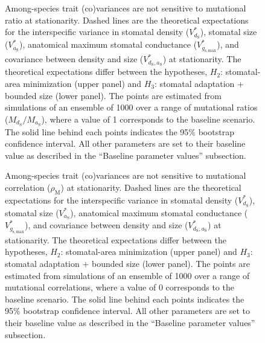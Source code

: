 \documentclass[
  letterpaper,
  DIV=11,
  numbers=noendperiod]{scrartcl}
\begin{document}
\newpage

\begin{figure}
\caption{Among-species trait (co)variances are not sensitive to mutational ratio at stationarity. Dashed lines are the theoretical expectations for the interspecific variance in stomatal density ($V_{d_\mathrm{S}}^*$), stomatal size ($V_{a_\mathrm{S}}^*$), anatomical maximum stomatal conductance ($V_{g_\mathrm{s,max}}^*$), and covariance between density and size ($V_{d_\mathrm{S},a_\mathrm{S}}^*$) at stationarity. The theoretical expectations differ between the hypotheses, $H_2$: stomatal-area minimization (upper panel) and $H_3$: stomatal adaptation + bounded size (lower panel). The points are estimated from simulations of an ensemble of 1000 over a range of mutational ratios ($M_{d_\mathrm{S}} / M_{a_\mathrm{S}}$), where a value of 1 corresponds to the baseline scenario. The solid line behind each points indicates the 95\% bootstrap confidence interval. All other parameters are set to their baseline value as described in the ``Baseline parameter values'' subsection.}

\end{figure}

\newpage

\begin{figure}
\caption{Among-species trait (co)variances are not sensitive to mutational correlation ($\rho_\mathrm{M}$) at stationarity. Dashed lines are the theoretical expectations for the interspecific variance in stomatal density ($V_{d_\mathrm{S}}^*$), stomatal size ($V_{a_\mathrm{S}}^*$), anatomical maximum stomatal conductance ($V_{g_\mathrm{s,max}}^*$), and covariance between density and size ($V_{d_\mathrm{S},a_\mathrm{S}}^*$) at stationarity. The theoretical expectations differ between the hypotheses, $H_2$: stomatal-area minimization (upper panel) and $H_3$: stomatal adaptation + bounded size (lower panel). The points are estimated from simulations of an ensemble of 1000 over a range of mutational correlations, where a value of 0 corresponds to the baseline scenario. The solid line behind each points indicates the 95\% bootstrap confidence interval. All other parameters are set to their baseline value as described in the ``Baseline parameter values'' subsection.}

\end{figure}

\newpage
\end{document}
